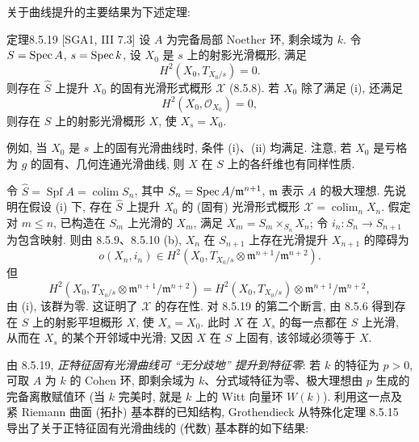 关于曲线提升的主要结果为下述定理:
\begin{origstatement}{定理}{8.5.19}\label{ch08:th8519}
[SGA1, III 7.3] 设 $A$ 为完备局部 Noether 环, 剩余域为 $k$. 令 $S=\operatorname{Spec} A$, $s=\operatorname{Spec} k$, 设 $X_0$ 是 $s$ 上的射影光滑概形, 满足
\begin{equation}H^2(X_0,T_{X_0/s})=0.\tag{i}\label{ch08:eq8519i}\end{equation}
则存在 $\widehat S$ 上提升 $X_0$ 的固有光滑形式概形 $\mathcal X$ (8.5.8). 若 $X_0$ 除了满足 (i), 还满足
\begin{equation}H^2(X_0,\mathcal O_{X_0})=0,\tag{ii}\label{ch08:eq8519ii}\end{equation}
则存在 $S$ 上的射影光滑概形 $X$, 使 $X_s=X_0$.
\end{origstatement}
例如, 当 $X_0$ 是 $s$ 上的固有光滑曲线时, 条件 (i)、(ii) 均满足. 注意, 若 $X_0$ 是亏格为 $g$ 的固有、几何连通光滑曲线, 则 $X$ 在 $S$ 上的各纤维也有同样性质.

令 $\widehat S=\operatorname{Spf}A=\operatorname{colim}S_n$, 其中 $S_n=\operatorname{Spec} A/\mathfrak m^{n+1}$, $\mathfrak m$ 表示 $A$ 的极大理想. 先说明在假设 (i) 下, 存在 $\widehat S$ 上提升 $X_0$ 的 (固有) 光滑形式概形 $\mathcal X=\operatorname{colim}_nX_n$. 假定对 $m\leq n$, 已构造在 $S_m$ 上光滑的 $X_m$, 满足 $X_m=S_m\times_{S_n}X_n$; 令 $i_n:S_n\to S_{n+1}$ 为包含映射. 则由 8.5.9、8.5.10 (b), $X_n$ 在 $S_{n+1}$ 上存在光滑提升 $X_{n+1}$ 的障碍为
\[o(X_n,i_n)\in H^2(X_0,T_{X_0/s}\otimes\mathfrak m^{n+1}/\mathfrak m^{n+2}).\]
但
\[H^2(X_0,T_{X_0/s}\otimes\mathfrak m^{n+1}/\mathfrak m^{n+2})=H^2(X_0,T_{X_0/s})\otimes\mathfrak m^{n+1}/\mathfrak m^{n+2},\]
由 (i), 该群为零. 这证明了 $\mathcal X$ 的存在性. 对 8.5.19 的第二个断言, 由 8.5.6 得到存在 $S$ 上的射影平坦概形 $X$, 使 $X_s=X_0$. 此时 $X$ 在 $X_s$ 的每一点都在 $S$ 上光滑, 从而在 $X_s$ 的某个开邻域中光滑; 又因 $X$ 在 $S$ 上固有, 该邻域必须等于 $X$.

由 8.5.19, \emph{正特征固有光滑曲线可 ``无分歧地'' 提升到特征零}: 若 $k$ 的特征为 $p>0$, 可取 $A$ 为 $k$ 的 Cohen 环, 即剩余域为 $k$、分式域特征为零、极大理想由 $p$ 生成的完备离散赋值环 (当 $k$ 完美时, 就是 $k$ 上的 Witt 向量环 $W(k)$). 利用这一点及紧 Riemann 曲面 (拓扑) 基本群的已知结构, Grothendieck 从特殊化定理 8.5.15 导出了关于正特征固有光滑曲线的 (代数) 基本群的如下结果:

